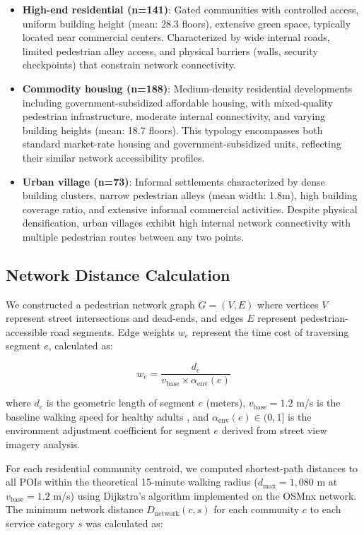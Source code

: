 \documentclass[10pt,conference,compsoc]{IEEEtran}
\begin{document}
\begin{itemize}
    \item \textbf{High-end residential (n=141)}: Gated communities with controlled access, uniform building height (mean: 28.3 floors), extensive green space, typically located near commercial centers. Characterized by wide internal roads, limited pedestrian alley access, and physical barriers (walls, security checkpoints) that constrain network connectivity.
    \item \textbf{Commodity housing (n=188)}: Medium-density residential developments including government-subsidized affordable housing, with mixed-quality pedestrian infrastructure, moderate internal connectivity, and varying building heights (mean: 18.7 floors). This typology encompasses both standard market-rate housing and government-subsidized units, reflecting their similar network accessibility profiles.
    \item \textbf{Urban village (n=73)}: Informal settlements characterized by dense building clusters, narrow pedestrian alleys (mean width: 1.8m), high building coverage ratio, and extensive informal commercial activities. Despite physical densification, urban villages exhibit high internal network connectivity with multiple pedestrian routes between any two points.
\end{itemize}

\subsection{Network Distance Calculation}

We constructed a pedestrian network graph $G = (V, E)$ where vertices $V$ represent street intersections and dead-ends, and edges $E$ represent pedestrian-accessible road segments. Edge weights $w_e$ represent the time cost of traversing segment $e$, calculated as:

\begin{equation}
w_e = \frac{d_e}{v_{\text{base}} \times \alpha_{\text{env}}(e)}
\label{eq:edge_weight}
\end{equation}

where $d_e$ is the geometric length of segment $e$ (meters), $v_{\text{base}} = 1.2$ m/s is the baseline walking speed for healthy adults \cite{bingham1998pedestrian}, and $\alpha_{\text{env}}(e) \in (0, 1]$ is the environment adjustment coefficient for segment $e$ derived from street view imagery analysis.

For each residential community centroid, we computed shortest-path distances to all POIs within the theoretical 15-minute walking radius ($d_{\text{max}} = 1{,}080$ m at $v_{\text{base}} = 1.2$ m/s) using Dijkstra's algorithm \cite{dijkstra1959note} implemented on the OSMnx network. The minimum network distance $D_{\text{network}}(c, s)$ for each community $c$ to each service category $s$ was calculated as:
\end{document}
